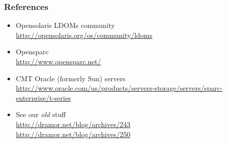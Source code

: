 \documentclass{beamer}
\begin{document}
\begin{frame}
\frametitle{References}

\begin{itemize}
\item Opensolaris LDOMs community
\\
\textcolor{red}{\url{http://opensolaris.org/os/community/ldoms}}
\item Opensparc
\\
\textcolor{red}{\url{http://www.opensparc.net/}}
\item CMT Oracle (formerly Sun) servers
\\
\textcolor{red}{\url{http://www.oracle.com/us/products/servers-storage/servers/sparc-enterprise/t-series}}
\item See our {\em old} stuff
\\
\textcolor{red}{\url{http://dramor.net/blog/archives/243}}
\\
\textcolor{red}{\url{http://dramor.net/blog/archives/250}}
\end{itemize}

\end{frame}
\end{document}

